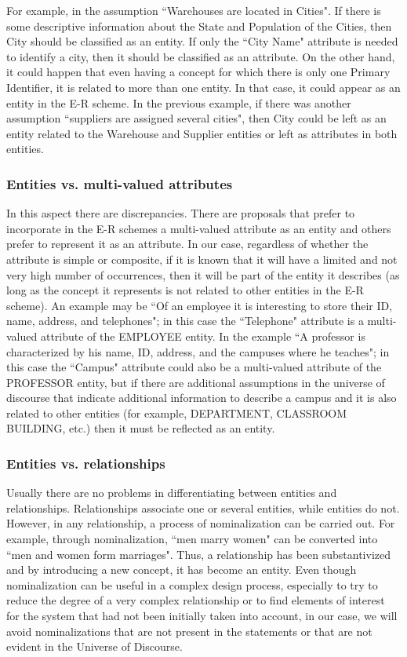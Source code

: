 \documentclass{article}
\numberwithin{figure}{section}
\begin{document}
For example, in the assumption ``Warehouses are located in Cities".  If there is some descriptive information about the State and Population of the Cities, then City should be classified as an entity.  If only the ``City Name" attribute is needed to identify a city, then it should be classified as an attribute.  On the other hand, it could happen that even having a concept for which there is only one Primary Identifier, it is related to more than one entity.  In that case, it could appear as an entity in the E-R scheme.  In the previous example, if there was another assumption ``suppliers are assigned several cities", then City could be left as an entity related to the Warehouse and Supplier entities or left as attributes in both entities.

\subsubsection{Entities vs. multi-valued attributes}

In this aspect there are discrepancies.  There are proposals that prefer to incorporate in the E-R schemes a multi-valued attribute as an entity and others prefer to represent it as an attribute.  In our case, regardless of whether the attribute is simple or composite, if it is known that it will have a limited and not very high number of occurrences, then it will be part of the entity it describes (as long as the concept it represents is not related to other entities in the E-R scheme).  An example may be ``Of an employee it is interesting to store their ID, name, address, and telephones"; in this case the ``Telephone" attribute is a multi-valued attribute of the EMPLOYEE entity.  In the example ``A professor is characterized by his name, ID, address, and the campuses where he teaches"; in this case the ``Campus" attribute could also be a multi-valued attribute of the PROFESSOR entity, but if there are additional assumptions in the universe of discourse that indicate additional information to describe a campus and it is also related to other entities (for example, DEPARTMENT, CLASSROOM BUILDING, etc.) then it must be reflected as an entity.

\subsubsection{Entities vs. relationships}

Usually there are no problems in differentiating between entities and relationships.  Relationships associate one or several entities, while entities do not.  However, in any relationship, a process of nominalization can be carried out.  For example, through nominalization, ``men marry women" can be converted into ``men and women form marriages".  Thus, a relationship has been substantivized and by introducing a new concept, it has become an entity.  Even though nominalization can be useful in a complex design process, especially to try to reduce the degree of a very complex relationship or to find elements of interest for the system that had not been initially taken into account, in our case, we will avoid nominalizations that are not present in the statements or that are not evident in the Universe of Discourse.
\end{document}
